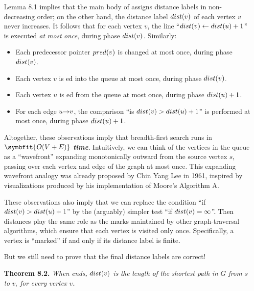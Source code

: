 Lemma 8.1 implies that the main body of  assigns distance labels in non-decreasing order; on the other hand, the distance label $dist(v)$ of each vertex $v$ never increases.
It follows that for each vertex $v$, the line “$dist(v) \gets dist(u) + 1$” is executed \textit{at most once}, during phase $dist(v)$.
Similarly:
\begin{itemize}
\item Each predecessor pointer $pred(v)$ is changed at most once, during phase $dist(v)$.
\item Each vertex $v$ is ed into the queue at most once, during phase $dist(v)$.
\item Each vertex $u$ is ed from the queue at most once, during phase $dist(u)+1$.
\item For each edge $u\mathord{\rightarrow}v$, the comparison “is $dist(v) > dist(u) + 1$” is performed at most once, during phase $dist(u) + 1$.
\end{itemize}
Altogether, these observations imply that breadth-first search runs in \textbf{\textit{$\symbfit{O(V + E)}$ time}}.
Intuitively, we can think of the vertices in the queue as a “wavefront” expanding monotonically outward from the source vertex $s$, passing over each vertex and edge of the graph at most once.
This expanding wavefront analogy was already proposed by Chin Yang Lee in 1961, inspired by visualizations produced by his implementation of Moore’s Algorithm A.

These observations also imply that we can replace the condition “if $dist(v) > dist(u) + 1$” by the (arguably) simpler test “if $dist(v) = \infty$”.
Then distances play the same role as the marks maintained by other graph-traversal algorithms, which ensure that each vertex is visited only once.
Specifically, a vertex is “marked” if and only if its distance label is finite.

But we still need to prove that the final distance labels are correct!

\textbf{Theorem 8.2.} \textsl{When  ends, $dist(v)$ is the length of the shortest path in $G$ from $s$ to $v$, for every vertex $v$.}

